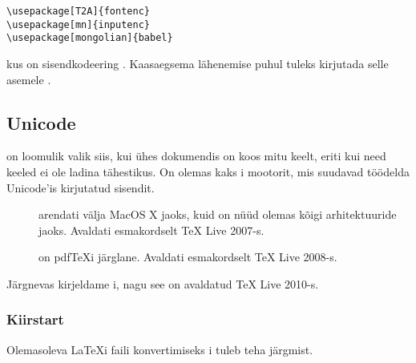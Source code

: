 \begin{lscommand}
\verb|\usepackage[T2A]{fontenc}|\\
\verb|\usepackage[mn]{inputenc}|\\
\verb|\usepackage[mongolian]{babel}|
\end{lscommand}

\noindent kus  on sisendkodeering . Kaasaegsema
lähenemise puhul tuleks kirjutada selle asemele .

\subsection{Unicode}

 on loomulik valik siis, kui ühes dokumendis on koos mitu
keelt, eriti kui need keeled ei ole ladina tähestikus. On olemas kaks
i mootorit, mis suudavad töödelda Unicode'is kirjutatud
sisendit.

\begin{description}
\item[\normalfont{}] arendati välja MacOS X jaoks, kuid on
    nüüd olemas kõigi arhitektuuride jaoks. Avaldati esmakordselt \TeX{}
    Live 2007-s.
\item[\normalfont{}] on pdf\TeX i järglane. Avaldati
    esmakordselt \TeX{} Live 2008-s.
\end{description}

Järgnevas kirjeldame i, nagu see on avaldatud \TeX{}
Live 2010-s.

\subsubsection{Kiirstart}

Olemasoleva \LaTeX i faili konvertimiseks i tuleb teha
järgmist.

